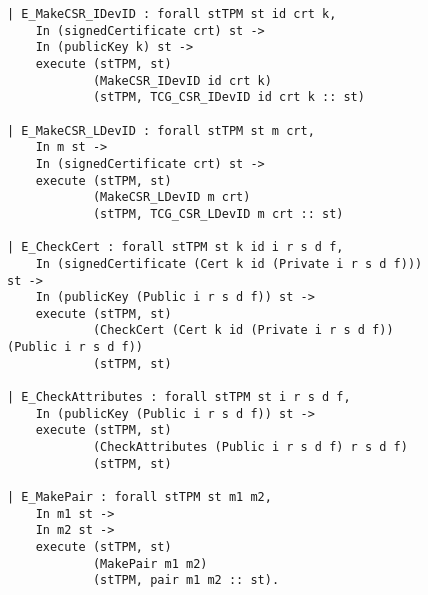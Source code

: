 \begin{figure}[h]
\begin{lstlisting}[language=Coq]
| E_MakeCSR_IDevID : forall stTPM st id crt k,
    In (signedCertificate crt) st ->
    In (publicKey k) st ->
    execute (stTPM, st)
            (MakeCSR_IDevID id crt k)
            (stTPM, TCG_CSR_IDevID id crt k :: st)

| E_MakeCSR_LDevID : forall stTPM st m crt,
    In m st ->
    In (signedCertificate crt) st ->
    execute (stTPM, st)
            (MakeCSR_LDevID m crt)
            (stTPM, TCG_CSR_LDevID m crt :: st)

| E_CheckCert : forall stTPM st k id i r s d f,
    In (signedCertificate (Cert k id (Private i r s d f))) st ->
    In (publicKey (Public i r s d f)) st ->
    execute (stTPM, st)
            (CheckCert (Cert k id (Private i r s d f)) (Public i r s d f))
            (stTPM, st)

| E_CheckAttributes : forall stTPM st i r s d f,
    In (publicKey (Public i r s d f)) st ->
    execute (stTPM, st)
            (CheckAttributes (Public i r s d f) r s d f)
            (stTPM, st)

| E_MakePair : forall stTPM st m1 m2,
    In m1 st ->
    In m2 st ->
    execute (stTPM, st)
            (MakePair m1 m2)
            (stTPM, pair m1 m2 :: st).
\end{lstlisting}
\end{figure}